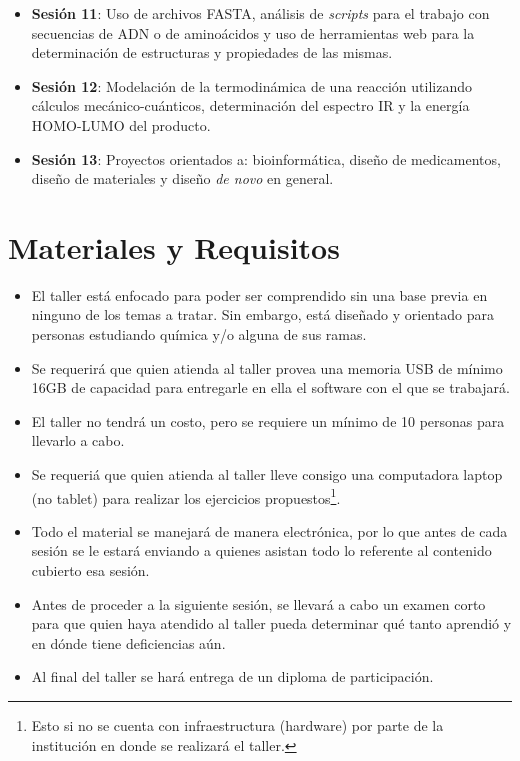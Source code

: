 \documentclass[10pt,letterpaper]{article}
\begin{document}
\begin{itemize}
\item \textbf{Sesi\'on 11}: Uso de archivos FASTA, an\'alisis de \emph{scripts} para el trabajo con secuencias de ADN o de amino\'acidos y uso de herramientas web para la determinaci\'on de estructuras y propiedades de las mismas.
\item \textbf{Sesi\'on 12}: Modelaci\'on de la termodin\'amica de una reacci\'on utilizando c\'alculos mec\'anico-cu\'anticos, determinaci\'on del espectro IR y la energ\'ia HOMO-LUMO del producto.
\item \textbf{Sesi\'on 13}: Proyectos orientados a: bioinform\'atica, dise\~no de medicamentos, dise\~no de materiales y dise\~no \textit{de novo} en general.
\end{itemize}

\section{Materiales y Requisitos}
\begin{itemize}
\item El taller est\'a enfocado para poder ser comprendido sin una base previa en ninguno de los temas a tratar. Sin embargo, est\'a dise\~nado y orientado para personas estudiando qu\'imica y/o alguna de sus ramas.
\item Se requerir\'a que quien atienda al taller provea una memoria USB de m\'inimo 16GB de capacidad para entregarle en ella el software con el que se trabajar\'a.
\item El taller no tendr\'a un costo, pero se requiere un m\'inimo de 10 personas para llevarlo a cabo.
\item Se requeri\'a que quien atienda al taller lleve consigo una computadora laptop (no tablet) para realizar los ejercicios propuestos\footnote{Esto si no se cuenta con infraestructura (hardware) por parte de la instituci\'on en donde se realizar\'a el taller.}.
\item Todo el material se manejar\'a de manera electr\'onica, por lo que antes de cada sesi\'on se le estar\'a enviando a quienes asistan todo lo referente al contenido cubierto esa sesi\'on.
\item Antes de proceder a la siguiente sesi\'on, se llevar\'a a cabo un examen corto para que quien haya atendido al taller pueda determinar qu\'e tanto aprendi\'o y en d\'onde tiene deficiencias a\'un.
\item Al final del taller se har\'a entrega de un diploma de participaci\'on.
\end{itemize}


\setlength{\bibindent}{2em}

\nocite{*}


\end{document}
